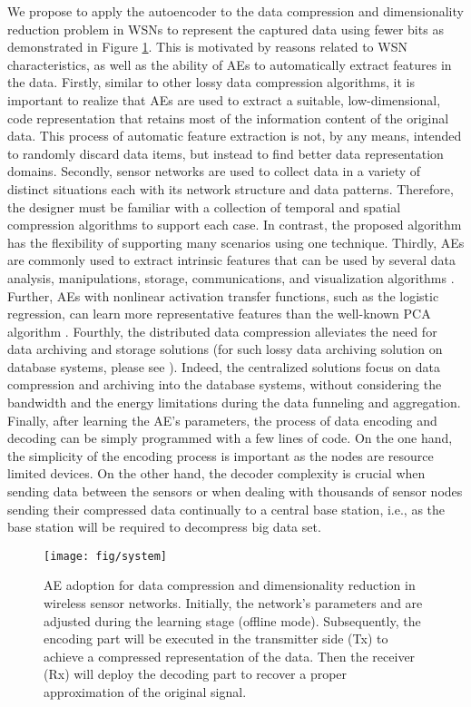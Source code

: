 \documentclass[a4paper,onecolumn,conference]{IEEEtran}
\begin{document}
We propose to apply the autoencoder to the data compression and dimensionality reduction problem in WSNs to represent the captured data using fewer bits as demonstrated in Figure \ref{fig:autoencoder_adoption}. This is motivated by reasons related to WSN characteristics, as well as the ability of AEs to automatically extract features in the data. Firstly, similar to other lossy data compression algorithms, it is important to realize that AEs are used to extract a suitable, low-dimensional, code representation that retains most of the information content of the original data. This process of automatic feature extraction is not, by any means, intended to randomly discard data items, but instead to find better data representation domains. Secondly, sensor networks are used to collect data in a variety of distinct situations each with its network structure and data patterns. Therefore, the designer must be familiar with a collection of temporal and spatial compression algorithms to support each case. In contrast, the proposed algorithm has the flexibility of supporting many scenarios using one technique. Thirdly, AEs are commonly used to extract intrinsic features that can be used by several data analysis, manipulations, storage, communications, and visualization algorithms \cite{hinton2006reducing}. Further, AEs with nonlinear activation transfer functions, such as the logistic regression, can learn more representative features than the well-known PCA algorithm \cite{japkowicz2000nonlinear}. Fourthly, the distributed data compression alleviates the need for data archiving and storage solutions (for such lossy data archiving solution on database systems, please see \cite{gandhi2009gamps}).
Indeed, the centralized solutions focus on data compression and archiving into the database systems, without considering the bandwidth and the energy limitations during the data funneling and aggregation. Finally, after learning the AE's parameters, the process of data encoding and decoding can be simply programmed with a few lines of code. On the one hand, the simplicity of the encoding process is important as the nodes are resource limited devices. On the other hand, the decoder complexity is crucial when sending data between the sensors or when dealing with thousands of sensor nodes sending their compressed
data continually to a central base station, i.e., as the base station will be required to decompress big data set.

\begin{figure}
\begin{centering}
\texttt{[image: fig/system]}
\par\end{centering}

\caption{\label{fig:autoencoder_adoption}AE adoption for data compression and dimensionality reduction in wireless sensor networks. Initially, the network's parameters  and  are adjusted during the learning stage (offline mode). Subsequently, the encoding part will be executed in the transmitter side (Tx) to achieve a compressed representation of the data. Then the receiver (Rx) will deploy the decoding part to recover a proper approximation of the original signal.}
\end{figure}
\end{document}
